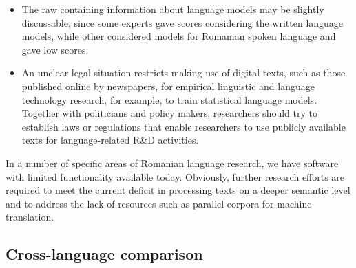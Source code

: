 \documentclass[]{../../metanetpaper}
\begin{document}
\begin{multicols}{2}
\begin{itemize}
\item The raw containing information about language models may be slightly discussable, since some experts gave scores considering the written language models, while other considered models for Romanian spoken language and gave low scores.
\item An unclear legal situation restricts making use of digital texts, such as those published online by newspapers, for empirical linguistic and language technology research, for example, to train statistical language models. Together with politicians and policy makers, researchers should try to establish laws or regulations that enable researchers to use publicly available texts for language-related R\&D activities.
\end{itemize}

In a number of specific areas of Romanian language research, we have software with limited functionality available today. Obviously, further research efforts are required to meet the current deficit in processing texts on a deeper semantic level and to address the lack of resources such as parallel corpora for machine translation.

\subsection{Cross-language comparison}


\end{multicols}
\end{document}
